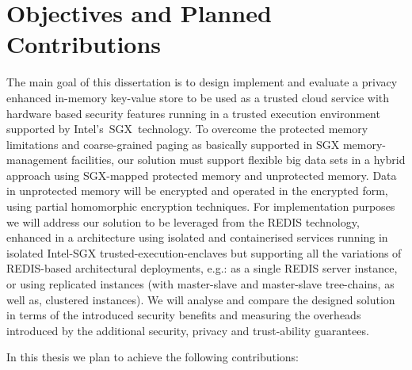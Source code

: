 \section{Objectives and Planned Contributions} %
\label{sec:objectives_and_planned_contributions}

The main goal of this dissertation is to design implement and evaluate a privacy enhanced in-memory key-value store to be used as a trusted cloud service with hardware based security features running in a trusted execution environment supported by Intel’s \gls{SGX} technology. To overcome the protected memory limitations and coarse-grained paging as basically supported in SGX memory-management facilities, our solution must support flexible big data sets in a hybrid approach using SGX-mapped protected memory and unprotected memory. Data in unprotected memory will be encrypted and operated in the encrypted form, using partial homomorphic encryption techniques.
For implementation purposes we will address our solution to be leveraged from the REDIS technology, enhanced in a architecture using isolated and containerised services running in isolated Intel-SGX trusted-execution-enclaves but supporting all the variations of REDIS-based architectural deployments, e.g.: as a single REDIS server instance, or using replicated instances (with master-slave and master-slave tree-chains, as well as, clustered instances). We will analyse and compare the designed solution in terms of the introduced security benefits and measuring the overheads introduced by the additional security, privacy and trust-ability guarantees.

In this thesis we plan to achieve the following contributions:

